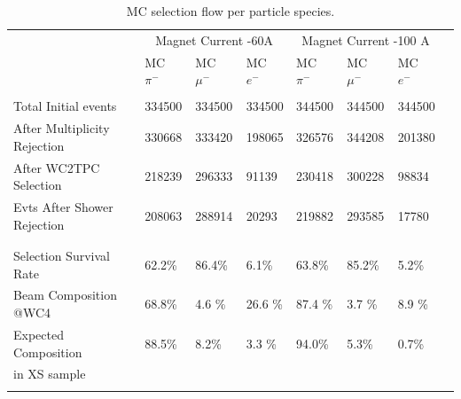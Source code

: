 \begin{table}[]
\centering
\begin{tabular}{| l | l | l | l | l | l | l | l | }
\hline
 &  \multicolumn{3}{|c|}{Magnet Current -60A} & \multicolumn{3}{|c|}{Magnet Current -100 A}\\

                                                  & MC $\pi^-$   & MC  $ \mu^-$ & MC  $e^-$ & MC  $\pi^-$ & MC  $\mu^-$ & MC  $e^-$  \\
\hline
&  &  &  & & &\\  
Total Initial events                     & 334500  & 334500 & 334500 &344500 &344500& 344500 \\
After Multiplicity Rejection        & 330668  & 333420 & 198065 &326576 &344208& 201380 \\
After WC2TPC Selection          & 218239  & 296333 & 91139  &230418 &300228& 98834  \\
Evts After Shower Rejection     & 208063  & 288914 &  20293 &219882 &293585& 17780  \\
&  &  &  & & &\\  
  \hline
&  &  &  & & &\\  
Selection Survival Rate           &62.2\% & 86.4\% & 6.1\% & 63.8\%& 85.2\%& 5.2\%\\
Beam Composition  @WC4      &  68.8\%   &  4.6 \%  & 26.6 \%    & 87.4 \% & 3.7 \%  & 8.9 \% \\ %
Expected Composition&  88.5\%   & 8.2\%   & 3.3 \%   & 94.0\%	& 5.3\% & 0.7\%\\
                                    in XS sample               &                      &                       &                   &                       &                        &\\  
                                                  &                      &                       &                   &                       &                        &\\  
\hline
\end{tabular}
\caption{MC selection flow per particle species.}
\label{tab:MCafterCutContaminants}
\end{table}


